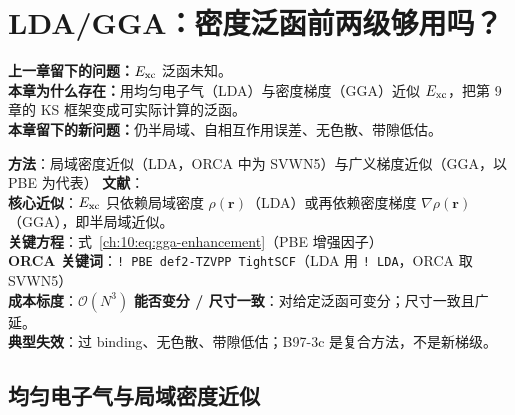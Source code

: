 
\section{LDA/GGA：密度泛函前两级够用吗？}
\label{ch:10:sec:title}

\begin{problemchain}
\textbf{上一章留下的问题：}$E_{\mathrm{xc}}$ 泛函未知。\\
\textbf{本章为什么存在：}用均匀电子气（LDA）与密度梯度（GGA）近似 $E_{\mathrm{xc}}$，把第 9 章的 KS 框架变成可实际计算的泛函。\\
\textbf{本章留下的新问题：}仍半局域、自相互作用误差、无色散、带隙低估。
\end{problemchain}

\begin{methodcard}
\textbf{方法}：局域密度近似（LDA，ORCA 中为 SVWN5）与广义梯度近似（GGA，以 PBE 为代表）\quad
\textbf{文献}：\citep{vosko1980,ceperley1980,perdew1981sie,becke1988,lee1988,perdew1996pbe}\\
\textbf{核心近似}：$E_{\mathrm{xc}}$ 只依赖局域密度 $\rho(\mathbf r)$（LDA）或再依赖密度梯度 $\nabla\rho(\mathbf r)$（GGA），即半局域近似。\\
\textbf{关键方程}：式~\eqref{ch:10:eq:gga-enhancement}（PBE 增强因子）\\
\textbf{ORCA 关键词}：\texttt{! PBE def2-TZVPP TightSCF}（LDA 用 \texttt{! LDA}，ORCA 取 SVWN5）\\
\textbf{成本标度}：$\mathcal{O}(N^3)$\quad
\textbf{能否变分 / 尺寸一致}：对给定泛函可变分；尺寸一致且广延。\\
\textbf{典型失效}：过 binding、无色散、带隙低估；B97-3c 是复合方法，不是新梯级。
\end{methodcard}

\subsection{均匀电子气与局域密度近似}
\label{ch:10:sec:lda}

